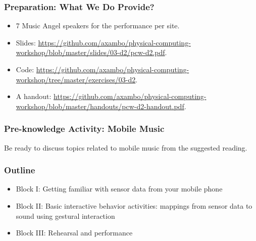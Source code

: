 \documentclass[screen, aspectratio=43]{beamer}
\begin{document}
%
\begin{frame}
  \frametitle{Preparation: What We Do Provide?}
        \begin{itemize}
        \item 7 Music Angel speakers for the performance per site.
        \item Slides: \url{https://github.com/axambo/physical-computing-workshop/blob/master/slides/03-d2/pcw-d2.pdf}.
        \item Code: \url{https://github.com/axambo/physical-computing-workshop/tree/master/exercises/03-d2}.
        \item A handout: \url{https://github.com/axambo/physical-computing-workshop/blob/master/handouts/pcw-d2-handout.pdf}.        
         \end{itemize}
\end{frame}
%
\begin{frame}
  \frametitle{Pre-knowledge Activity: Mobile Music}
  Be ready to discuss topics related to mobile music from the suggested reading.
\end{frame}
%
\begin{frame}
  \frametitle{Outline}
      \begin{itemize}
	\item Block I: Getting familiar with sensor data from your mobile phone
	\item Block II: Basic interactive behavior activities: mappings from sensor data to sound using gestural interaction
	\item Block III: Rehearsal and performance
    \end{itemize}  
\end{frame}
%
\end{document}
